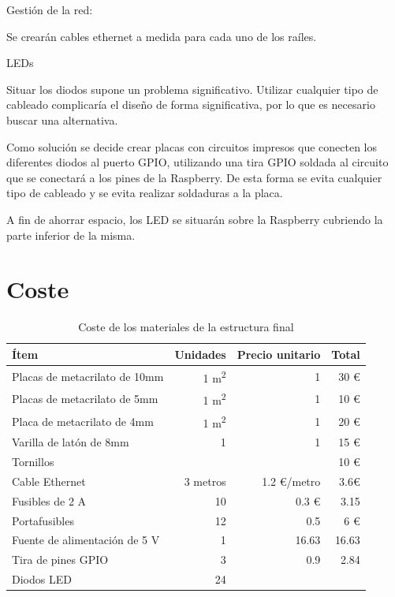 Gestión de la red:

Se crearán cables ethernet a medida para cada uno de los raíles.

LEDs

Situar los diodos supone un problema significativo. Utilizar cualquier tipo de cableado complicaría el diseño de forma significativa, por lo que es necesario buscar una alternativa.

Como solución se decide crear placas con circuitos impresos que conecten los diferentes diodos al puerto GPIO, utilizando una tira GPIO soldada al circuito que se conectará a los pines de la Raspberry. De esta forma se evita cualquier tipo de cableado y se evita realizar soldaduras a la placa.

A fin de ahorrar espacio, los LED se situarán sobre la Raspberry cubriendo la parte inferior de la misma.

\section{Coste}

\begin{table}[H]
\centering
\begin{tabular}{|l|r|r|r|}
\hline
\textbf{Ítem} & \textbf{Unidades} & \textbf{Precio unitario} & \textbf{Total} \\ \hline
Placas de metacrilato de 10mm & 1 m\textsuperscript{2} & 1 & 30 € \\ \hline
Placas de metacrilato de 5mm & 1 m\textsuperscript{2} & 1 & 10 € \\ \hline
Placa de metacrilato de 4mm & 1 m\textsuperscript{2} & 1 & 20 € \\ \hline
Varilla de latón de 8mm & 1 & 1& 15 €\\ \hline
Tornillos & & & 10 €\\ \hline
Cable Ethernet & 3 metros & 1.2 €/metro & 3.6€\\ \hline
Fusibles de 2 A & 10 & 0.3 € & 3.15\\ \hline
Portafusibles & 12 & 0.5 & 6 € \\ \hline
Fuente de alimentación de 5 V & 1 & 16.63 & 16.63 \\ \hline
Tira de pines GPIO & 3 & 0.9 & 2.84 \\ \hline
Diodos LED & 24 & &\\ \hline
\end{tabular}
\caption{Coste de los materiales de la estructura final}
\end{table}
